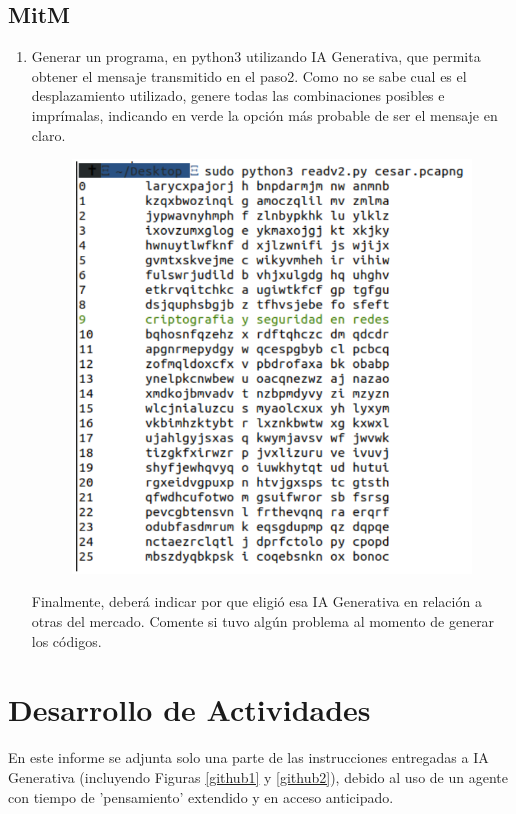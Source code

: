 \documentclass[letter,12pt]{article}
\begin{document}
\subsection{MitM}
\begin{enumerate}
    \item Generar un programa, en python3 utilizando IA Generativa, que permita obtener el mensaje transmitido en el paso2. Como no se sabe cual es el desplazamiento utilizado, genere todas las combinaciones posibles e imprímalas, indicando en verde la opción más probable de ser el mensaje en claro.
    
    \begin{figure}[H]
        \centering
        \includegraphics[width=12cm]{actividades/A3.png}
        \label{fig:a3}
    \end{figure}
    
    Finalmente, deberá indicar por que eligió esa IA Generativa en relación a otras del mercado. Comente si tuvo algún problema al momento de generar los códigos.

\end{enumerate}

\section{Desarrollo de Actividades}
En este informe se adjunta solo una parte de las instrucciones entregadas a IA Generativa (incluyendo Figuras \ref{github1} y \ref{github2}), debido al uso de un agente con tiempo de 'pensamiento' extendido y en acceso anticipado.
\end{document}
